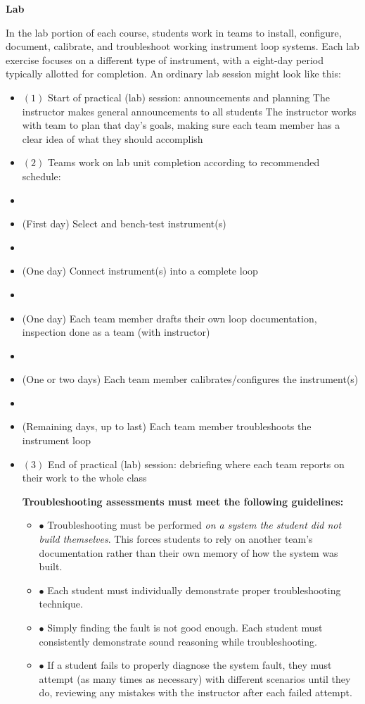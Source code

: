 \noindent
{\bf Lab}

In the lab portion of each course, students work in teams to install, configure, document, calibrate, and troubleshoot working instrument loop systems.  Each lab exercise focuses on a different type of instrument, with a eight-day period typically allotted for completion.  An ordinary lab session might look like this:

\begin{itemize}
\item{$(1)$} Start of practical (lab) session: announcements and planning
 The instructor makes general announcements to all students
 The instructor works with team to plan that day's goals, making sure each team member has a clear idea of what they should accomplish
\item{$(2)$} Teams work on lab unit completion according to recommended schedule:
\item\item{(First day)} Select and bench-test instrument(s)
\item\item{(One day)} Connect instrument(s) into a complete loop
\item\item{(One day)} Each team member drafts their own loop documentation, inspection done as a team (with instructor)
\item\item{(One or two days)} Each team member calibrates/configures the instrument(s)
\item\item{(Remaining days, up to last)} Each team member troubleshoots the instrument loop
\item{$(3)$} End of practical (lab) session: debriefing where each team reports on their work to the whole class
\medskip

\vskip 10pt

\noindent
{\bf Troubleshooting assessments must meet the following guidelines:}

\begin{itemize}
\item{$\bullet$} Troubleshooting must be performed {\it on a system the student did not build themselves}.  This forces students to rely on another team's documentation rather than their own memory of how the system was built.
\item{$\bullet$} Each student must individually demonstrate proper troubleshooting technique.
\item{$\bullet$} Simply finding the fault is not good enough.  Each student must consistently demonstrate sound reasoning while troubleshooting.
\item{$\bullet$} If a student fails to properly diagnose the system fault, they must attempt (as many times as necessary) with different scenarios until they do, reviewing any mistakes with the instructor after each failed attempt.
\medskip


\end{itemize}
\end{itemize}
